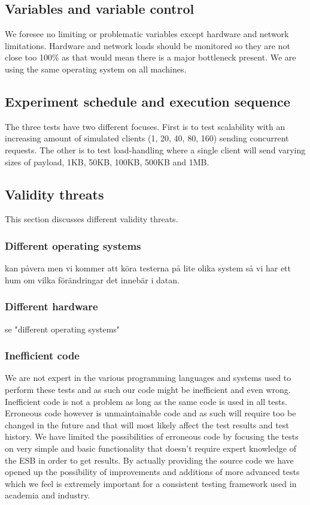 \subsection{Variables and variable control}
We foresee no limiting or problematic variables except hardware and network limitations.
Hardware and network loads should be monitored so they are not close too 100\% as that would mean there is a major bottleneck present. 
We are using the same operating system on all machines. 
\subsection{Experiment schedule and execution sequence}
The three tests have two different focuses. First is to test scalability with an increasing amount of simulated clients (1, 20, 40, 80, 160) sending concurrent requests. 
The other is to test load-handling where a single client will send varying sizes of payload, 1KB, 50KB, 100KB, 500KB and 1MB.
\subsection{Validity threats}
This section discusses different validity threats.
\subsubsection{Different operating systems}
kan påvera men vi kommer att köra testerna på lite olika system så vi har ett hum om vilka förändringar det innebär i datan.
\subsubsection{Different hardware}
se "different operating systems"
\subsubsection{Inefficient code}
We are not expert in the various programming languages and systems used to perform these tests and as such our code might be inefficient and even wrong. Inefficient code is not a problem as long as the same code is used in all tests. Erroneous code however is unmaintainable code and as such will require too be changed in the future and that will most likely affect the test results and test history. 
We have limited the possibilities of erroneous code by focusing the tests on very simple and basic functionality that doesn't require expert knowledge of the ESB in order to get results.
By actually providing the source code we have opened up the possibility of improvements and additions of more advanced tests which we feel is extremely important for a consistent testing framework used in academia and industry.

